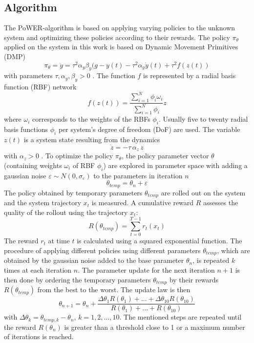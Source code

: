 \documentclass[letterpaper, 10 pt, conference]{ieeeconf}  %
\begin{document}
\subsection{Algorithm}
The PoWER-algorithm is based on applying varying policies to the unknown system and optimizing these policies according to their rewards.
The policy $\pi_\theta$ applied on the system in this work is based on Dynamic Movement Primitives (DMP)
\begin{equation}
\pi_{\theta}=\ddot{y}=\tau^{2}\alpha_y\beta_y(g-y(t)-\tau^{2}\alpha_y \dot{y}(t)+\tau^{2}f(z(t))
\end{equation}
with parameters $\tau,\alpha_y, \beta_y>0$ \cite{DMP_web}.
The function $f$ is represented by a radial basis function (RBF) network 
\begin{equation}
f(z(t))=\frac{\sum_{i=1}^N \phi_i \omega_i}{\sum_{i=1}^N \phi_i}z 
\end{equation}
where $\omega_i$ corresponds to the weights of the RBFs $\phi_i$. Usually five to twenty radial basis functions $\phi_i$ per system's degree of freedom (DoF) are used. The variable $z(t)$ is a system state resulting from the dynamics 
\begin{equation}
\dot{z}=-\tau\,\alpha_z \,z 
\end{equation}
with $\alpha_z>0$ \cite{DMP_web}.
To optimize the policy $\pi_\theta$, the policy parameter vector $\theta$ (containing weights $\omega_i$ of RBF $\phi_i$) are explored in parameter space with adding a gaussian noise $\varepsilon \sim N(0,\sigma_{\varepsilon})$ to the parameters in iteration $n$ \cite{kober2009policy}
\begin{equation}
\theta_{temp}=\theta_n+\varepsilon
\end{equation}
The policy obtained by temporary parameters $\theta_{temp}$ are rolled out on the system and the system trajectory $x_t$ is measured. A cumulative reward $R$ assesses the quality of the rollout using the trajectory $x_t$: %
\begin{equation}
R(\theta_{temp})=\sum_{t=0}^{T-1} r_t(x_t) 
\end{equation}
The reward $r_t$ at time $t$ is calculated using a squared exponential function. The procedure of applying different policies using different parameters $\theta_{temp}$, which are obtained by the gaussian noise added to the base parameter $\theta_n$, is repeated $k$ times at each iteration $n$. The parameter update for the next iteration $n+1$ is then done by ordering the temporary parameters $\theta_{temp}$ by their rewards $R(\theta_{temp})$ from the best to the worst. The update law is then
\begin{equation}
\theta_{n+1}=\theta_n+\frac{\Delta\theta_1 R(\theta_1)+...+\Delta\theta_{10} R(\theta_{10})}{R(\theta_1)+...+R(\theta_{10})}
\end{equation}
with $\Delta\theta_k=\theta_{temp,k}-\theta_n$, $k=1,2,...,10$. 
The mentioned steps are repeated until the reward $R(\theta_n)$ is greater than a threshold close to 1 or a maximum number of iterations is reached.
\end{document}
